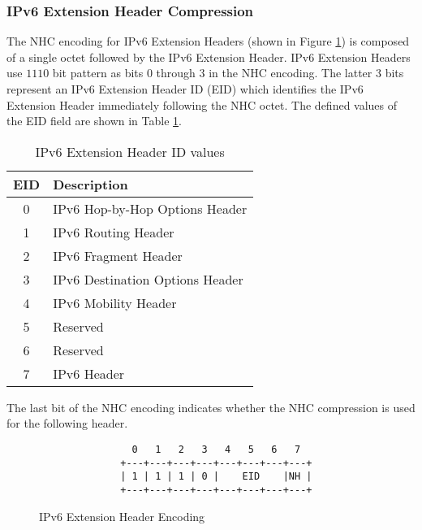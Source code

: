 \documentclass[12pt, titlepage, a4paper]{report}
\newenvironment{mylisting}
{\begin{list}{}{\setlength{\leftmargin}{1em}}\item\footnotesize}
{\end{list}}
\begin{document}
\subsubsection{IPv6 Extension Header Compression}
The NHC encoding for IPv6 Extension Headers (shown in Figure \ref{fig:ipv6.ext.header}) is composed of a single octet followed by the IPv6 Extension Header.  IPv6 Extension Headers use  $1110$ bit pattern as bits $0$ through $3$ in the NHC encoding. The latter 3 bits represent an IPv6 Extension Header ID (EID) which identifies the IPv6 Extension Header immediately following the NHC octet. The defined values of the EID field are shown in Table \ref{table:ipv6.ext.header}. 
\begin{table}[htp]
\begin{center}
        \begin{tabular}{|c|l|}
          \hline
          EID & Description\\
          \hline
          \hline          
           0 & IPv6 Hop-by-Hop Options Header \cite{rfc2460}\\
           1 & IPv6 Routing Header \cite{rfc2460}\\
           2 & IPv6 Fragment Header \cite{rfc2460}\\
           3 & IPv6 Destination Options Header \cite{rfc2460}\\
           4 & IPv6 Mobility Header \cite{rfc3775}\\
           5 & Reserved\\
           6 & Reserved\\
           7 & IPv6 Header\\
          \hline
        \end{tabular}
\end{center}
\caption{IPv6 Extension Header ID values}\label{table:ipv6.ext.header}
\end{table}

The last bit of the NHC encoding indicates whether the NHC compression is used for the following header.
\begin{figure}[htp]
\begin{mylisting}
\begin{verbatim}
                0   1   2   3   4   5   6   7
              +---+---+---+---+---+---+---+---+
              | 1 | 1 | 1 | 0 |    EID    |NH |
              +---+---+---+---+---+---+---+---+
\end{verbatim}
\end{mylisting}
\caption{IPv6 Extension Header Encoding}\label{fig:ipv6.ext.header}
\end{figure}
\end{document}

